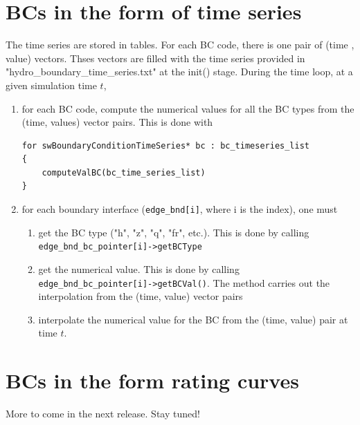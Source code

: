 
\section{BCs in the form of time series}
The time series are stored in tables. For each BC code, there is one pair of (time , value) vectors. Thses vectors are filled with the time series provided in "hydro\_boundary\_time\_series.txt" at the init() stage. During the time loop, at a given simulation time $t$, 
%
%
\begin{enumerate}
%
\item for each BC code, compute the numerical values for all the BC types from the (time, values) vector pairs.
This is done with
\begin{verbatim}
for swBoundaryConditionTimeSeries* bc : bc_timeseries_list
{
    computeValBC(bc_time_series_list)
}
\end{verbatim}
%
\item for each boundary interface (\texttt{edge\_bnd[i]}, where i is the index), one must
\begin{enumerate}
\item get the BC type ("h", "z", "q", "fr", etc.). This is done by calling \texttt{edge\_bnd\_bc\_pointer[i]->getBCType}
\item get the numerical value. This is done by calling \texttt{edge\_bnd\_bc\_pointer[i]->getBCVal()}. The method carries out the interpolation from the (time, value) vector pairs
\item interpolate the numerical value for the BC from the (time, value) pair at time $t$.
\end{enumerate}
\end{enumerate}


\section{BCs in the form rating curves}

More to come in the next release. Stay tuned!